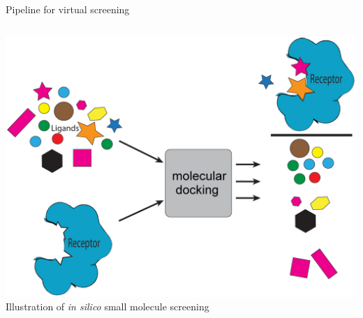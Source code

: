 \begin{frame}{Pipeline for virtual screening}
\begin{columns}
\begin{column}{0.4\textwidth}
        \includegraphics[width=\textwidth]{../figures/vs1.png}\\
      {\hfill \scriptsize Illustration of  \textit{in silico} small molecule screening}
    \end{column}
    \end{columns}
\end{frame}

